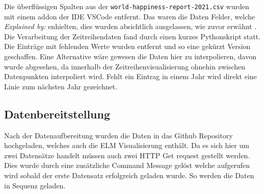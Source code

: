 Die überflüssigen Spalten aus der \texttt{world-happiness-report-2021.csv} wurden mit einem addon der IDE VSCode entfernt. Das waren die Daten Felder, welche \textit{Explained by:} enhielten, dies wurden absichtlich ausgelassen, wie zuvor erwähnt . Die Verarbeitung der Zeitreihendaten fand durch einen kurzes Pythonskript statt. Die Einträge mit fehlenden Werte wurden entfernt und so eine gekürzt Version geschaffen. Eine Alternative wäre gewesen die Daten hier zu interpolieren, davon wurde abgesehen, da innerhalb der Zeitreihenvisualisierung ohnehin zwischen Datenpunkten interpoliert wird. Fehlt ein Eintrag in einem Jahr wird direkt eine Linie zum nächsten Jahr gezeichnet. 

\subsection{Datenbereitstellung}

Nach der Datenaufbereitung wurden die Daten in das Github Repository hochgeladen, welches auch die ELM Visualisierung enthält. Da es sich hier um zwei Datensätze handelt müssen auch zwei HTTP Get request gestellt werden. Dies wurde durch eine zusätzliche Command Message gelöst welche aufgerufen wird sobald der erste Datensatz erfolgreich geladen wurde. So werden die Daten in Sequenz geladen. 